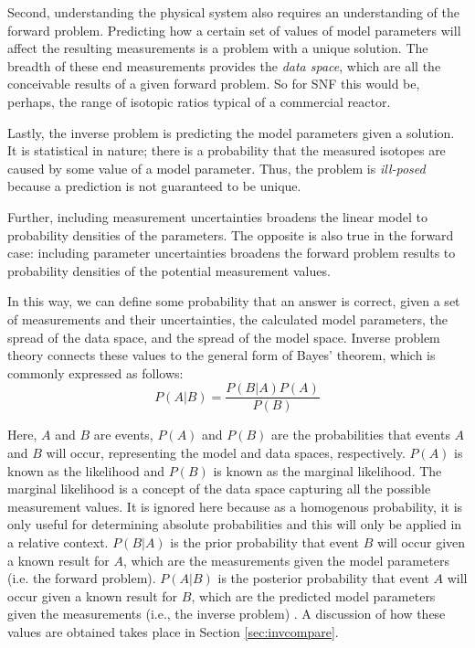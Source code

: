 Second, understanding the physical system also requires an understanding of the
forward problem. Predicting how a certain set of values of model parameters
will affect the resulting measurements is a problem with a unique solution.
The breadth of these end measurements provides the \textit{data space}, which
are all the conceivable results of a given forward problem. So for \gls{SNF}
this would be, perhaps, the range of isotopic ratios typical of a commercial
reactor. 

Lastly, the inverse problem is predicting the model parameters given a
solution.  It is statistical in nature; there is a probability that the
measured isotopes are caused by some value of a model parameter. Thus, the
problem is \textit{ill-posed} because a prediction is not guaranteed to be
unique. 

Further, including measurement uncertainties broadens the linear model
to probability densities of the parameters. The opposite is also true in the
forward case: including parameter uncertainties broadens the forward problem
results to probability densities of the potential measurement values.
\cite{inverse_theory}

In this way, we can define some probability that an answer is correct, given a
set of measurements and their uncertainties, the calculated model parameters,
the spread of the data space, and the spread of the model space. Inverse
problem theory connects these values to the general form of Bayes' theorem,
which is commonly expressed as follows:
\begin{equation}
  \label{eq:bayes}
  P(A|B) = \frac{P(B|A)P(A)}{P(B)}
\end{equation}

Here, $A$ and $B$ are events, $P(A)$ and $P(B)$ are the probabilities that
events $A$ and $B$ will occur, representing the model and data spaces,
respectively. $P(A)$ is known as the likelihood and $P(B)$ is known as the
marginal likelihood. The marginal likelihood is a concept of the data space
capturing all the possible measurement values. It is ignored here because as a
homogenous probability, it is only useful for determining absolute
probabilities and this will only be applied in a relative context.  $P(B|A)$ is
the prior probability that event $B$ will occur given a known result for $A$,
which are the measurements given the model parameters (i.e. the forward
problem).  $P(A|B)$ is the posterior probability that event $A$ will occur
given a known result for $B$, which are the predicted model parameters given
the measurements (i.e., the inverse problem) \cite{inverse_theory,
gentle_bayes}. A discussion of how these values are obtained takes place in
Section \ref{sec:invcompare}.

